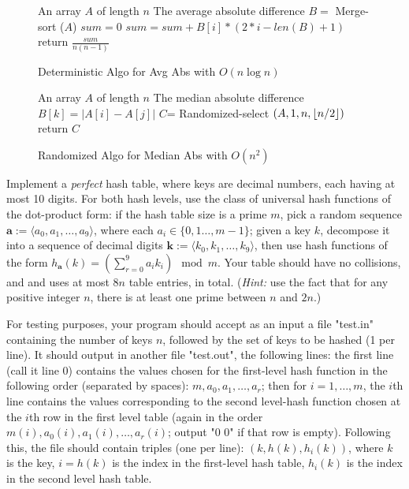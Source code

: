 \documentclass{article}
\DeclarePairedDelimiter\floor{\lfloor}{\rfloor}
\begin{document}
\begin{figure*}[!htbp]
  \centering
  \begin{algorithmic}
    \REQUIRE An array $A$ of length $n$
\ENSURE The average absolute difference
\STATE $B =$ Merge-sort ($A$)
\STATE $sum = 0$
	\STATE $sum = sum + B[i] * ( 2*i - len(B) + 1 ) $
\ENDFOR
\STATE return $\frac{sum}{n(n-1)}$
  \end{algorithmic}
  \caption{Deterministic Algo for Avg Abs with $O(n\log n)$}
  \label{fig:deter-avg-1}
\end{figure*}

\begin{figure*}[!htbp]
  \centering
  \begin{algorithmic}
        \REQUIRE An array $A$ of length $n$
    \ENSURE The median absolute difference
		\STATE $B[k] = |A[i] - A[j]|$
	\ENDFOR
    \ENDFOR
    \STATE $C$= Randomized-select $(A, 1, n, \floor{n/2})$
    \STATE return $C$
  \end{algorithmic}
  \caption{Randomized Algo for Median Abs with $O(n^{2})$}
  \label{fig:random-median}
\end{figure*}









\medskip 

Implement a {\it perfect} hash table, where keys are decimal numbers,
each having at most 10 digits. For both hash levels, use the class of
universal hash functions of the dot-product form: if the hash table
size is a prime $m$, pick a random sequence $\mathbf{a}:=\langle
a_0,a_1,\ldots,a_9\rangle$, where each $a_i\in\{0,1\ldots,m-1\}$;
given a key $k$, decompose it into a sequence of decimal digits
$\mathbf k:=\langle k_0,k_1,\ldots,k_9\rangle$, then use hash
functions of the form $ h_{\mathbf{a}}(k)=(\sum_{r=0}^9a_ik_i)\mod m$.   
Your table should have  no collisions, and and uses at most $8n$ table
entries, in total. ({\it Hint:} use the fact that for any positive
integer $n$, there is at least one prime between $n$ and $2n$.) 

For testing purposes, your program  should accept as an input a file
"test.in" containing the number of keys $n$, followed by the set of
keys to be hashed (1 per line). It should output in another file
"test.out", the following lines: the first line (call it line 0)
contains the values chosen for the first-level hash function in the
following order (separated by spaces): $m, a_0,a_1,\ldots,a_r$; then
for $i=1,\ldots,m$, the $i$th line contains the values corresponding
to the second level-hash function chosen at the $i$th row in the first
level table (again in the order $m(i), a_0(i),a_1(i),\ldots,a_r(i)$;
output "0 0" if that row is empty). Following this, the file should
contain triples (one per line): $(k,h(k),h_i(k))$, where $k$ is the
key, $i=h(k)$ is the index in the first-level hash table, $h_i(k)$ is
the index in the second level hash table. 
\end{document}
